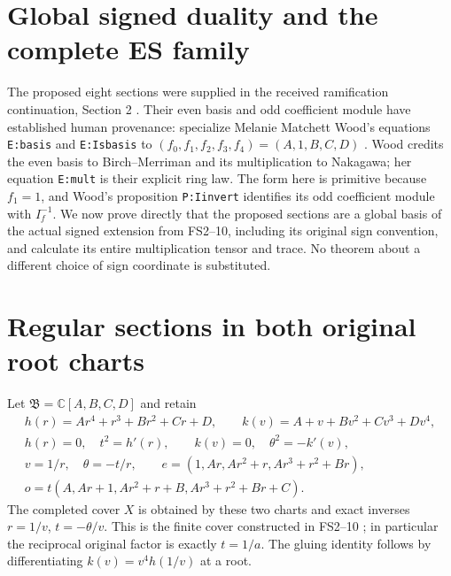 \documentclass[11pt]{article}
\newcommand{\C}{\mathbb C}
\begin{document}
\section{Global signed duality and the complete ES family}


The proposed eight sections were supplied in the received
ramification continuation, Section 2 \cite{RamificationReceived}. Their
even basis and odd coefficient module have established human
provenance: specialize Melanie Matchett Wood's equations
\texttt{E:basis} and \texttt{E:Isbasis} to
$(f_0,f_1,f_2,f_3,f_4)=(A,1,B,C,D)$ \cite{WoodBinary}.
Wood credits the even basis to Birch--Merriman and its
multiplication to Nakagawa; her equation \texttt{E:mult}
is their explicit ring law. The form here is primitive
because $f_1=1$, and Wood's proposition \texttt{P:Iinvert}
identifies its odd coefficient module with $I_f^{-1}$.
We now prove directly that the proposed sections are a
global basis of the actual signed extension from FS2--10,
including its original sign convention, and calculate its
entire multiplication tensor and trace. No theorem about
a different choice of sign coordinate is substituted.

\section{Regular sections in both original root charts}
Let $\mathfrak B=\C[A,B,C,D]$ and retain
\begin{equation}
 \begin{gathered}
 h(r)=Ar^4+r^3+Br^2+Cr+D,\qquad
 k(v)=A+v+Bv^2+Cv^3+Dv^4,\\
 h(r)=0,\quad t^2=h'(r),\qquad
 k(v)=0,\quad\theta^2=-k'(v),\\
 v=1/r,\quad\theta=-t/r,\qquad
 e=(1,Ar,Ar^2+r,Ar^3+r^2+Br),\\
 o=t(A,Ar+1,Ar^2+r+B,Ar^3+r^2+Br+C).
 \end{gathered}
 \tag{GB1}
\end{equation}
The completed cover $X$ is obtained by these two charts
and exact inverses $r=1/v$, $t=-\theta/v$.
This is the finite cover constructed in FS2--10
\cite{Fable037}; in particular the reciprocal original factor
is exactly $t=1/a$. The gluing identity follows by
differentiating $k(v)=v^4h(1/v)$ at a root.
\end{document}
